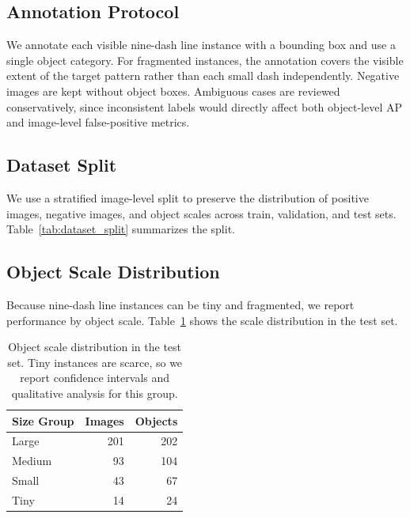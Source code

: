 \documentclass[conference,a4paper]{IEEEtran}
\begin{document}
\subsection{Annotation Protocol}

We annotate each visible nine-dash line instance with a bounding box and use a single object category.
For fragmented instances, the annotation covers the visible extent of the target pattern rather than each small dash independently.
Negative images are kept without object boxes.
Ambiguous cases are reviewed conservatively, since inconsistent labels would directly affect both object-level AP and image-level false-positive metrics.

\subsection{Dataset Split}

We use a stratified image-level split to preserve the distribution of positive images, negative images, and object scales across train, validation, and test sets.
Table~\ref{tab:dataset_split} summarizes the split.

\begin{table}[!htbp]
\centering
\caption{Dataset composition by split. In-domain negatives are cartographic images that do not contain the target pattern, while out-domain negatives are non-cartographic or weakly related images.}
\label{tab:dataset_split}
\end{table}

\subsection{Object Scale Distribution}

Because nine-dash line instances can be tiny and fragmented, we report performance by object scale.
Table~\ref{tab:test_scale} shows the scale distribution in the test set.

\begin{table}[!htbp]
\centering
\caption{Object scale distribution in the test set. Tiny instances are scarce, so we report confidence intervals and qualitative analysis for this group.}
\label{tab:test_scale}
\begin{tabular}{lrr}
\toprule
Size Group & Images & Objects \\
\midrule
Large  & 201 & 202 \\
Medium & 93  & 104 \\
Small  & 43  & 67  \\
Tiny   & 14  & 24  \\
\bottomrule
\end{tabular}
\end{table}
\end{document}
